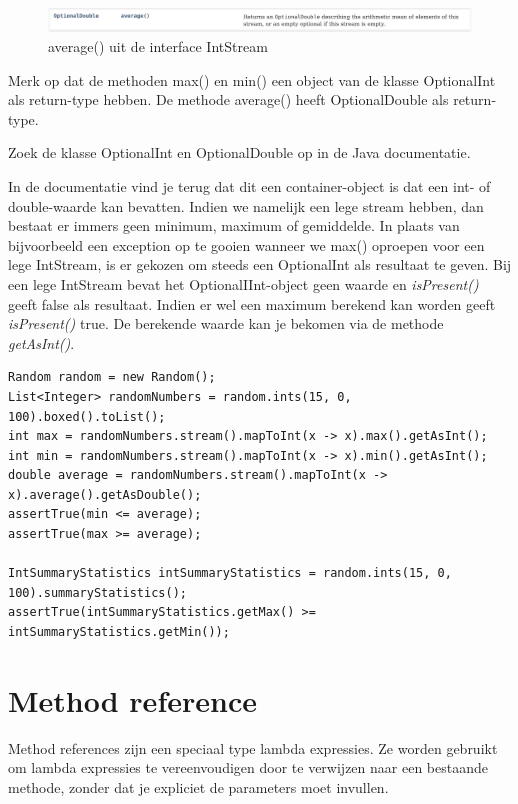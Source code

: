 \begin{figure}[H]
\includegraphics[width=\linewidth]{images/h6/intstream_average.png}
\caption{average() uit de interface IntStream}
\label{fig:instream_average}
\end{figure}

Merk op dat de methoden max() en min() een object van de klasse OptionalInt als return-type hebben. De methode average() heeft OptionalDouble als return-type. 

\begin{oefening}
Zoek de klasse OptionalInt en OptionalDouble op in de Java documentatie.
\end{oefening}

In de documentatie vind je terug dat dit een container-object is dat een int- of double-waarde kan bevatten. Indien we namelijk een lege stream hebben, dan bestaat er immers geen minimum, maximum of gemiddelde. In plaats van bijvoorbeeld een exception op te gooien wanneer we max() oproepen voor een lege IntStream, is er gekozen om steeds een OptionalInt als resultaat te geven. Bij een lege IntStream bevat het OptionalIInt-object geen waarde en \textit{isPresent()} geeft false als resultaat. Indien er wel een maximum berekend kan worden geeft \textit{isPresent()} true. De berekende waarde kan je bekomen via de methode \textit{getAsInt()}.

\begin{lstlisting}
Random random = new Random();
List<Integer> randomNumbers = random.ints(15, 0, 100).boxed().toList();
int max = randomNumbers.stream().mapToInt(x -> x).max().getAsInt();
int min = randomNumbers.stream().mapToInt(x -> x).min().getAsInt();
double average = randomNumbers.stream().mapToInt(x -> x).average().getAsDouble();
assertTrue(min <= average);
assertTrue(max >= average);

IntSummaryStatistics intSummaryStatistics = random.ints(15, 0, 100).summaryStatistics();
assertTrue(intSummaryStatistics.getMax() >= intSummaryStatistics.getMin());
\end{lstlisting}


\section{Method reference}

Method references zijn een speciaal type lambda expressies. Ze worden gebruikt om lambda expressies te vereenvoudigen door te verwijzen naar een bestaande methode, zonder dat je expliciet de parameters moet invullen.

